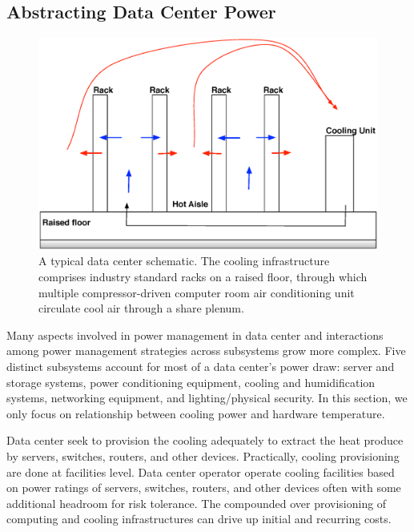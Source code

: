 \documentclass[JIP]{ipsj}
\begin{document}
\subsection{Abstracting Data Center Power}\label{thermodynamics}
\begin{figure}[thb]
\begin{center}
\includegraphics[scale=0.3]{graphs/datacenter.eps}
\end{center}
\caption{A typical data center schematic.
The cooling infrastructure comprises industry standard racks on a raised floor, through which multiple compressor-driven computer room air conditioning unit circulate cool air through a share plenum.}
\label{fig:datacenter}
\end{figure} 
Many aspects involved in power management in data center and interactions among power management strategies across subsystems grow more complex.
Five distinct subsystems account for most of a data center's power draw:   server and storage systems, power conditioning equipment, cooling and humidification systems, networking equipment, and lighting/physical security.
In this section, we only focus on relationship between cooling power and hardware temperature.

Data center seek to provision the cooling adequately to extract the heat produce by servers, switches, routers, and other devices.
Practically, cooling provisioning are done at facilities level.
Data center operator operate cooling facilities based on power ratings of servers, switches, routers, and other devices often with some additional headroom for risk tolerance. 
The compounded over provisioning of computing and cooling infrastructures can drive up initial and recurring costs. 
\end{document}
